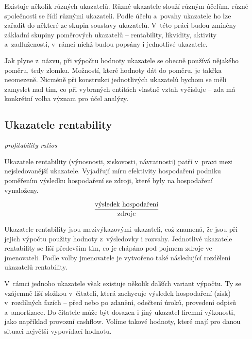 Existuje několik různých ukazatelů. Různé ukazatele slouží různým účelům, různé společnosti se řídí různými ukazateli. Podle účelu a~povahy ukazatele ho lze zařadit do některé ze skupin soustavy ukazatelů. V~této práci budou zmíněny základní skupiny poměrových ukazatelů -- rentability, likvidity, aktivity a~zadluženosti, v~rámci nichž budou popsány i jednotlivé ukazatele.

Jak plyne z~názvu, při výpočtu hodnoty ukazatele se obecně používá nějakého poměru, tedy zlomku. Možností, které hodnoty dát do poměru, je takřka neomezeně. Nicméně při konstrukci jednotlivých ukazatelů bychom se měli zamyslet nad tím, co při vybraných entitách vlastně vztah vyčísluje -- zda má konkrétní volba význam pro účel analýzy.\cite{kisling}

\subsection{Ukazatele rentability}
\textit{profitability ratios}

Ukazatele rentability (výnosnosti, ziskovosti, návratnosti) patří v~praxi mezi nejsledovanější ukazatele. Vyjadřují míru efektivity hospodaření podniku poměřením výsledku hospodaření se zdroji, které byly na hospodaření vynaloženy.

$$\dfrac{\text{výsledek hospodaření}}{\text{zdroje}}$$

Ukazatele rentability jsou mezivýkazovými ukazateli, což znamená, že jsou při jejich výpočtu použity hodnoty z~výsledovky i rozvahy. Jednotlivé ukazatele rentability se liší především tím, co je chápáno pod pojmem zdroje ve jmenovateli.\cite{mendelu} Podle volby jmenovatele je vytvořeno také následující rozdělení ukazatelů rentability. 

V~rámci jednoho ukazatele však existuje několik dalších variant výpočtu. Ty se vzájemně liší složkou v~čitateli, která zachycuje výsledek hospodaření (zisk) v~rozdílných fazích -- před nebo po zdanění, odečtení úroků, provedení odpisů a~amortizace. Do čitatele může být dosazen i jiný ukazatel firemní výkonosti, jako například provozní cashflow. Volíme takové hodnoty, které mají pro danou situaci největší vypovídací hodnotu.

